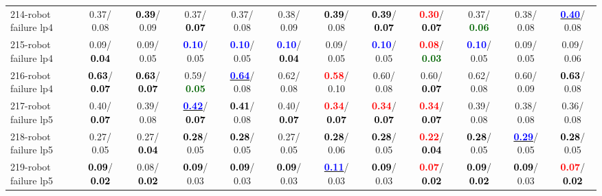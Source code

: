 \begin{table}[h]
\begin{center}
{\begin{tabular}{lc|c|c|c|c|c|c|c|c|c|c}
214-robot failure lp4 &   0.37/  0.08 & \textcolor{black}{\textbf{  0.39}}/  0.09 &   0.37/\textcolor{black}{\textbf{  0.07}} &   0.37/  0.08 &   0.38/  0.09 & \textcolor{black}{\textbf{  0.39}}/  0.08 & \textcolor{black}{\textbf{  0.39}}/\textcolor{black}{\textbf{  0.07}} & \textcolor{red}{\textbf{  0.30}}/\textcolor{black}{\textbf{  0.07}} &   0.37/\textcolor{darkgreen}{\textbf{  0.06}} &   0.38/  0.08 & \underline{\textcolor{blue}{\textbf{  0.40}}}/  0.08 \\
215-robot failure lp4 &   0.09/\textcolor{black}{\textbf{  0.04}} &   0.09/  0.05 & \textcolor{blue}{\textbf{  0.10}}/  0.05 & \textcolor{blue}{\textbf{  0.10}}/  0.05 & \textcolor{blue}{\textbf{  0.10}}/\textcolor{black}{\textbf{  0.04}} &   0.09/  0.05 & \textcolor{blue}{\textbf{  0.10}}/  0.05 & \textcolor{red}{\textbf{  0.08}}/\textcolor{darkgreen}{\textbf{  0.03}} & \textcolor{blue}{\textbf{  0.10}}/  0.05 &   0.09/  0.05 &   0.09/  0.06 \\
216-robot failure lp4 & \textcolor{black}{\textbf{  0.63}}/\textcolor{black}{\textbf{  0.07}} & \textcolor{black}{\textbf{  0.63}}/\textcolor{black}{\textbf{  0.07}} &   0.59/\textcolor{darkgreen}{\textbf{  0.05}} & \underline{\textcolor{blue}{\textbf{  0.64}}}/  0.08 &   0.62/  0.08 & \textcolor{red}{\textbf{  0.58}}/  0.10 &   0.60/  0.08 &   0.60/\textcolor{black}{\textbf{  0.07}} &   0.62/  0.08 &   0.60/  0.09 & \textcolor{black}{\textbf{  0.63}}/  0.08 \\
217-robot failure lp5 &   0.40/\textcolor{black}{\textbf{  0.07}} &   0.39/  0.08 & \underline{\textcolor{blue}{\textbf{  0.42}}}/\textcolor{black}{\textbf{  0.07}} & \textcolor{black}{\textbf{  0.41}}/  0.08 &   0.40/\textcolor{black}{\textbf{  0.07}} & \textcolor{red}{\textbf{  0.34}}/\textcolor{black}{\textbf{  0.07}} & \textcolor{red}{\textbf{  0.34}}/\textcolor{black}{\textbf{  0.07}} & \textcolor{red}{\textbf{  0.34}}/\textcolor{black}{\textbf{  0.07}} &   0.39/  0.08 &   0.38/  0.08 &   0.36/  0.08 \\
218-robot failure lp5 &   0.27/  0.05 &   0.27/\textcolor{black}{\textbf{  0.04}} & \textcolor{black}{\textbf{  0.28}}/  0.05 & \textcolor{black}{\textbf{  0.28}}/  0.05 &   0.27/  0.05 & \textcolor{black}{\textbf{  0.28}}/  0.06 & \textcolor{black}{\textbf{  0.28}}/  0.05 & \textcolor{red}{\textbf{  0.22}}/\textcolor{black}{\textbf{  0.04}} & \textcolor{black}{\textbf{  0.28}}/  0.05 & \underline{\textcolor{blue}{\textbf{  0.29}}}/  0.05 & \textcolor{black}{\textbf{  0.28}}/  0.05 \\
219-robot failure lp5 & \textcolor{black}{\textbf{  0.09}}/\textcolor{black}{\textbf{  0.02}} &   0.08/\textcolor{black}{\textbf{  0.02}} & \textcolor{black}{\textbf{  0.09}}/  0.03 & \textcolor{black}{\textbf{  0.09}}/  0.03 & \textcolor{black}{\textbf{  0.09}}/  0.03 & \underline{\textcolor{blue}{\textbf{  0.11}}}/  0.03 & \textcolor{black}{\textbf{  0.09}}/  0.03 & \textcolor{red}{\textbf{  0.07}}/\textcolor{black}{\textbf{  0.02}} & \textcolor{black}{\textbf{  0.09}}/\textcolor{black}{\textbf{  0.02}} & \textcolor{black}{\textbf{  0.09}}/  0.03 & \textcolor{red}{\textbf{  0.07}}/\textcolor{black}{\textbf{  0.02}} \\

\end{tabular}}
\end{center}
\end{table}
